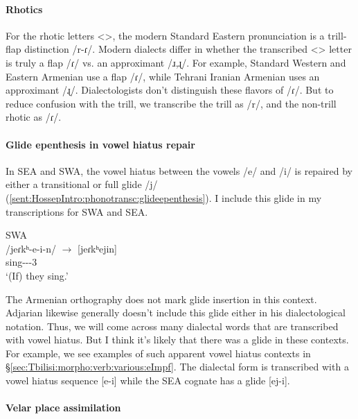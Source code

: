 \paragraph{Rhotics}
For the rhotic letters <>, the modern Standard Eastern pronunciation is a trill-flap distinction /r-ɾ/. Modern dialects differ in whether the transcribed <> letter is truly a flap /ɾ/ vs. an approximant /ɹ,ɻ/. For example, Standard Western and Eastern Armenian use a flap /ɾ/, while Tehrani Iranian Armenian uses an approximant /ɻ/. Dialectologists don't distinguish these flavors of /ɾ/. But to reduce confusion with the trill, we transcribe the trill as /r/, and the non-trill rhotic as /ɾ/. 


\paragraph{Glide epenthesis in vowel hiatus repair}

In SEA and SWA, the vowel hiatus between the vowels /e/ and /i/ is repaired by either a transitional or full glide /j/ (\ref{sent:HossepIntro:phonotransc:glideepenthesis}). I include this glide in my transcriptions for SWA and SEA. 

\begin{exe}
	\ex SWA \\
	\gll /jeɾkʰ-e-i-n/ $\rightarrow$ [jeɾkʰejin] \\
	sing-{\thgloss}-{\pst}-3{\pl} \\
	\trans `(If) they sing.' \label{sent:HossepIntro:phonotransc:glideepenthesis}\\
\end{exe}



The Armenian orthography does not mark glide insertion in this context. Adjarian likewise generally doesn't include this glide either in his dialectological notation. Thus, we will come across many dialectal words that are transcribed with vowel hiatus. But I think it's likely  that there was a glide in these  contexts. For example, we see examples of such apparent vowel hiatus contexts in \S\ref{sec:Tbilisi:morpho:verb:various:eImpf}. The dialectal form is transcribed with a vowel hiatus sequence [e-i] while the SEA cognate has a glide [ej-i]. 


\paragraph{Velar place assimilation}

